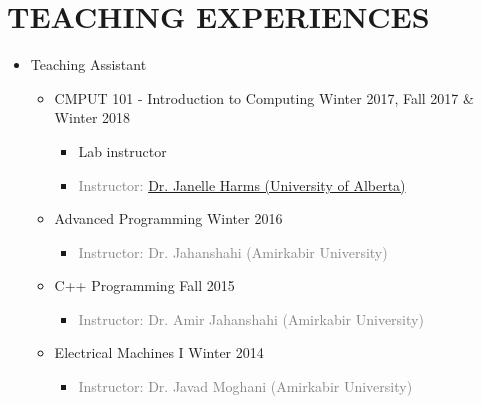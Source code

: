 \begin{cvcolumns}
\end{cvcolumns}

\vspace{-2em}
\section{TEACHING EXPERIENCES}
\begin{itemize}
	\item Teaching Assistant
	\begin{itemize}
	
		\item {} CMPUT 101 - Introduction to Computing \hfill Winter 2017, Fall 2017 \& Winter 2018
		\begin{itemize} 
			\item Lab instructor
			
			\item\textcolor{gray}{Instructor: \href{https://webdocs.cs.ualberta.ca/~harms/}{Dr. Janelle Harms (University of Alberta)}}
		\end{itemize}
			
		\item {} Advanced Programming \hfill Winter 2016
		\begin{itemize} 
			\item\textcolor{gray}{Instructor: Dr. Jahanshahi (Amirkabir University)}
		\end{itemize}
		
		\item {} C++ Programming \hfill Fall 2015
		\begin{itemize} 
			\item \textcolor{gray}{Instructor: Dr. Amir Jahanshahi (Amirkabir University)}
		\end{itemize}
		
		\item {} Electrical Machines I \hfill Winter 2014
		\begin{itemize} 
			\item \textcolor{gray}{Instructor: Dr. Javad Moghani (Amirkabir University)}
		\end{itemize}
		

\end{itemize}
\end{itemize}

